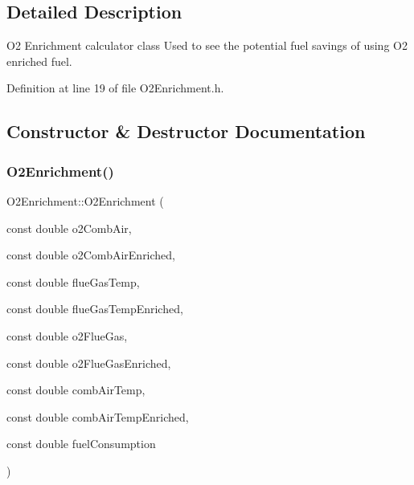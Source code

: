 \subsection{Detailed Description}
O2 Enrichment calculator class Used to see the potential fuel savings of using O2 enriched fuel. 

Definition at line 19 of file O2\+Enrichment.\+h.



\subsection{Constructor \& Destructor Documentation}
\mbox{\label{class_o2_enrichment_a8d60cf5ef65e8528a5a432c7cec75699}} 
\subsubsection{\texorpdfstring{O2\+Enrichment()}{O2Enrichment()}\hspace{0.1cm}{\footnotesize\ttfamily [1/3]}}
{\footnotesize\ttfamily O2\+Enrichment\+::\+O2\+Enrichment (\begin{DoxyParamCaption}\item[{const double}]{o2\+Comb\+Air,  }\item[{const double}]{o2\+Comb\+Air\+Enriched,  }\item[{const double}]{flue\+Gas\+Temp,  }\item[{const double}]{flue\+Gas\+Temp\+Enriched,  }\item[{const double}]{o2\+Flue\+Gas,  }\item[{const double}]{o2\+Flue\+Gas\+Enriched,  }\item[{const double}]{comb\+Air\+Temp,  }\item[{const double}]{comb\+Air\+Temp\+Enriched,  }\item[{const double}]{fuel\+Consumption }\end{DoxyParamCaption})\hspace{0.3cm}{\ttfamily [inline]}}

